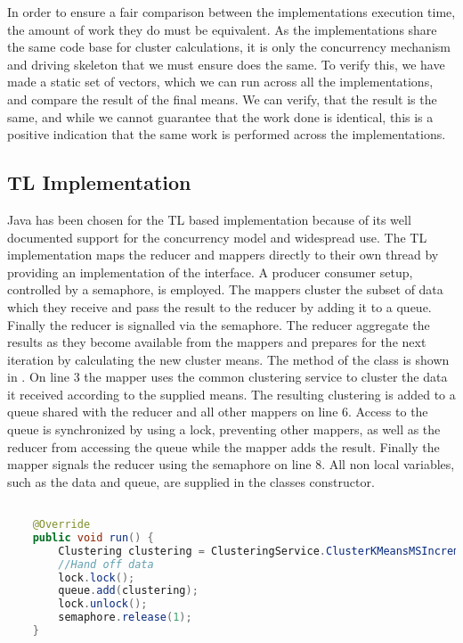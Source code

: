 In order to ensure a fair comparison between the implementations execution time, the amount of work they do must be equivalent. As the implementations share the same code base for cluster calculations, it is only the concurrency mechanism and driving skeleton that we must ensure does the same. To verify this, we have made a static set of vectors, which we can run across all the implementations, and compare the result of the final means. We can verify, that the result is the same, and while we cannot guarantee that the work done is identical, this is a positive indication that the same work is performed across the implementations.

\subsection{\ac{TL} Implementation}
Java has been chosen for the \ac{TL} based implementation because of its well documented support for the concurrency model and widespread use. The \ac{TL} implementation maps the reducer and mappers directly to their own thread by providing an implementation of the  interface. A producer consumer setup, controlled by a semaphore, is employed. The mappers cluster the subset of data which they receive and pass the result to the reducer by adding it to a queue. Finally the reducer is signalled via the semaphore. The reducer aggregate the results as they become available from the mappers  and prepares for the next iteration by calculating the new cluster means. The  method of the  class is shown in . On line 3 the mapper uses the common clustering service to cluster the data it received according to the supplied means. The resulting clustering is added to a queue shared with the reducer and all other mappers on line 6. Access to the queue is synchronized by using a lock, preventing other mappers, as well as the reducer from accessing the queue while the mapper adds the result. Finally the mapper signals the reducer using the semaphore on line 8. All non local variables, such as the data and queue, are supplied in the  classes constructor.

\begin{lstlisting}[float,label=lst:tl_implementation,
  caption={\ac{TL} Implementation},
  language=Java,  
  showspaces=false,
  showtabs=false,
  breaklines=true,
  showstringspaces=false,
  breakatwhitespace=true,
  commentstyle=\color{greencomments},
  keywordstyle=\color{bluekeywords},
  stringstyle=\color{redstrings}]  % Start your code-block

    @Override
    public void run() {
        Clustering clustering = ClusteringService.ClusterKMeansMSIncremental(data, means);
        //Hand off data
        lock.lock();
        queue.add(clustering);
        lock.unlock();
        semaphore.release(1);
    }  
\end{lstlisting}

